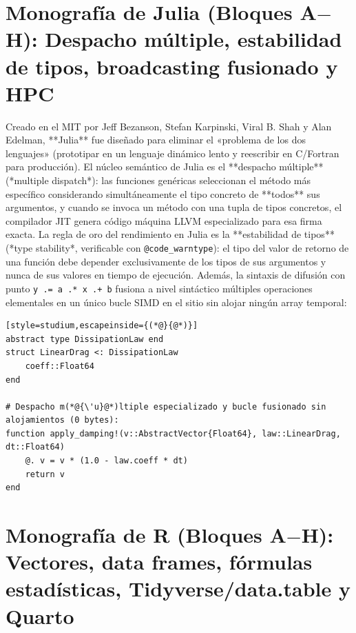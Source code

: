 \documentclass{book}
\begin{document}
\section{Monografía de Julia (Bloques A\(-\)H): Despacho múltiple, estabilidad de tipos, broadcasting fusionado y HPC}

Creado en el MIT por Jeff Bezanson, Stefan Karpinski, Viral B. Shah y Alan Edelman, **Julia** fue diseñado para eliminar el «problema de los dos lenguajes» (prototipar en un lenguaje dinámico lento y reescribir en C/Fortran para producción). El núcleo semántico de Julia es el **despacho múltiple** (*multiple dispatch*): las funciones genéricas seleccionan el método más específico considerando simultáneamente el tipo concreto de **todos** sus argumentos, y cuando se invoca un método con una tupla de tipos concretos, el compilador JIT genera código máquina LLVM especializado para esa firma exacta. La regla de oro del rendimiento en Julia es la **estabilidad de tipos** (*type stability*, verificable con \texttt{@code\_warntype}): el tipo del valor de retorno de una función debe depender exclusivamente de los tipos de sus argumentos y nunca de sus valores en tiempo de ejecución. Además, la sintaxis de difusión con punto \texttt{y .= a .* x .+ b} fusiona a nivel sintáctico múltiples operaciones elementales en un único bucle SIMD en el sitio sin alojar ningún array temporal:
\begin{lstlisting}[style=studium,escapeinside={(*@}{@*)}]
abstract type DissipationLaw end
struct LinearDrag <: DissipationLaw
    coeff::Float64
end

# Despacho m(*@{\'u}@*)ltiple especializado y bucle fusionado sin alojamientos (0 bytes):
function apply_damping!(v::AbstractVector{Float64}, law::LinearDrag, dt::Float64)
    @. v = v * (1.0 - law.coeff * dt)
    return v
end
\end{lstlisting}

\section{Monografía de R (Bloques A\(-\)H): Vectores, data frames, fórmulas estadísticas, Tidyverse/data.table y Quarto}
\end{document}
